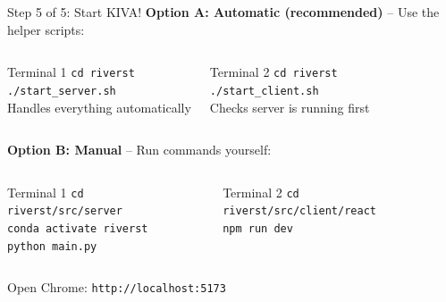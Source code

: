 \documentclass[aspectratio=169]{beamer}
\begin{document}
\begin{frame}{Step 5 of 5: Start KIVA!}
\textbf{Option A: Automatic (recommended)} -- Use the helper scripts:

\vspace{0.2cm}

\begin{columns}[T]
\begin{block}{Terminal 1}
\small
\texttt{cd riverst}\\
\texttt{./start\_server.sh}\\[0.2cm]
\textcolor{kivagray}{\footnotesize Handles everything automatically}
\end{block}

\begin{block}{Terminal 2}
\small
\texttt{cd riverst}\\
\texttt{./start\_client.sh}\\[0.2cm]
\textcolor{kivagray}{\footnotesize Checks server is running first}
\end{block}
\end{columns}

\vspace{0.3cm}

\textbf{Option B: Manual} -- Run commands yourself:

\vspace{0.1cm}

\begin{columns}[T]
\begin{block}{Terminal 1}
\footnotesize
\texttt{cd riverst/src/server}\\
\texttt{conda activate riverst}\\
\texttt{python main.py}
\end{block}

\begin{block}{Terminal 2}
\footnotesize
\texttt{cd riverst/src/client/react}\\
\texttt{npm run dev}
\end{block}
\end{columns}

\vspace{0.2cm}

\begin{center}
\large Open Chrome: \texttt{http://localhost:5173}
\end{center}
\end{frame}
\end{document}
